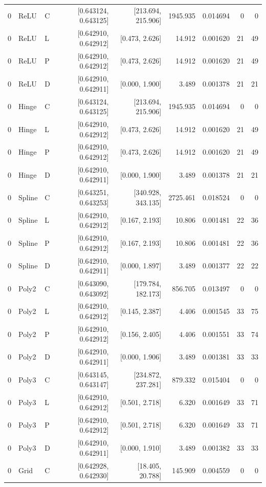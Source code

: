 \begin{longtable}{lllrrrrrr}
0 & ReLU & C & [0.643124, 0.643125] & [213.694, 215.906] & 1945.935 & 0.014694 & 0 & 0 \\
0 & ReLU & L & [0.642910, 0.642912] & [0.473, 2.626] & 14.912 & 0.001620 & 21 & 49 \\
0 & ReLU & P & [0.642910, 0.642912] & [0.473, 2.626] & 14.912 & 0.001620 & 21 & 49 \\
0 & ReLU & D & [0.642910, 0.642911] & [0.000, 1.900] & 3.489 & 0.001378 & 21 & 21 \\
0 & Hinge & C & [0.643124, 0.643125] & [213.694, 215.906] & 1945.935 & 0.014694 & 0 & 0 \\
0 & Hinge & L & [0.642910, 0.642912] & [0.473, 2.626] & 14.912 & 0.001620 & 21 & 49 \\
0 & Hinge & P & [0.642910, 0.642912] & [0.473, 2.626] & 14.912 & 0.001620 & 21 & 49 \\
0 & Hinge & D & [0.642910, 0.642911] & [0.000, 1.900] & 3.489 & 0.001378 & 21 & 21 \\
0 & Spline & C & [0.643251, 0.643253] & [340.928, 343.135] & 2725.461 & 0.018524 & 0 & 0 \\
0 & Spline & L & [0.642910, 0.642912] & [0.167, 2.193] & 10.806 & 0.001481 & 22 & 36 \\
0 & Spline & P & [0.642910, 0.642912] & [0.167, 2.193] & 10.806 & 0.001481 & 22 & 36 \\
0 & Spline & D & [0.642910, 0.642911] & [0.000, 1.897] & 3.489 & 0.001377 & 22 & 22 \\
0 & Poly2 & C & [0.643090, 0.643092] & [179.784, 182.173] & 856.705 & 0.013497 & 0 & 0 \\
0 & Poly2 & L & [0.642910, 0.642912] & [0.145, 2.387] & 4.406 & 0.001545 & 33 & 75 \\
0 & Poly2 & P & [0.642910, 0.642912] & [0.156, 2.405] & 4.406 & 0.001551 & 33 & 74 \\
0 & Poly2 & D & [0.642910, 0.642911] & [0.000, 1.906] & 3.489 & 0.001381 & 33 & 33 \\
0 & Poly3 & C & [0.643145, 0.643147] & [234.872, 237.281] & 879.332 & 0.015404 & 0 & 0 \\
0 & Poly3 & L & [0.642910, 0.642912] & [0.501, 2.718] & 6.320 & 0.001649 & 33 & 71 \\
0 & Poly3 & P & [0.642910, 0.642912] & [0.501, 2.718] & 6.320 & 0.001649 & 33 & 71 \\
0 & Poly3 & D & [0.642910, 0.642911] & [0.000, 1.910] & 3.489 & 0.001382 & 33 & 33 \\
0 & Grid & C & [0.642928, 0.642930] & [18.405, 20.788] & 145.909 & 0.004559 & 0 & 0 \\

\end{longtable}
